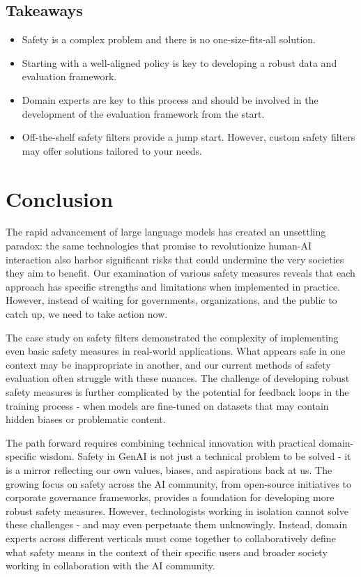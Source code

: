 \subsection{Takeaways}

\begin{itemize}
\item Safety is a complex problem and there is no one-size-fits-all solution.
\item Starting with a well-aligned policy is key to developing a robust data and evaluation framework.
\item Domain experts are key to this process and should be involved in the development of the evaluation framework from the start.
\item Off-the-shelf safety filters provide a jump start. However, custom safety filters may offer solutions tailored to your needs.
\end{itemize}

\section{Conclusion}

The rapid advancement of large language models has created an unsettling paradox: the same technologies that promise to revolutionize human-AI interaction also harbor significant risks that could undermine the very societies they aim to benefit. Our examination of various safety measures reveals that each approach has specific strengths and limitations when implemented in practice. However, instead of waiting for governments, organizations, and the public to catch up, we need to take action now.

The case study on safety filters demonstrated the complexity of implementing even basic safety measures in real-world applications. What appears safe in one context may be inappropriate in another, and our current methods of safety evaluation often struggle with these nuances. The challenge of developing robust safety measures is further complicated by the potential for feedback loops in the training process - when models are fine-tuned on datasets that may contain hidden biases or problematic content.

The path forward requires combining technical innovation with practical domain-specific wisdom. Safety in GenAI is not just a technical problem to be solved - it is a mirror reflecting our own values, biases, and aspirations back at us. The growing focus on safety across the AI community, from open-source initiatives to corporate governance frameworks, provides a foundation for developing more robust safety measures. However, technologists working in isolation cannot solve these challenges - and may even perpetuate them unknowingly. Instead, domain experts across different verticals must come together to collaboratively define what safety means in the context of their specific users and broader society working in collaboration with the AI community.

